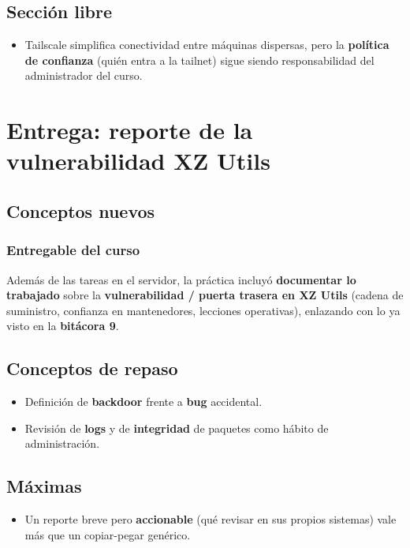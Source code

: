 \documentclass[11pt, letterpaper]{article}
\begin{document}
\subsection{Sección libre}
\label{sec:orgf17d0d6}

\begin{itemize}
\item Tailscale simplifica conectividad entre máquinas dispersas, pero la \textbf{política de confianza} (quién entra a la tailnet) sigue siendo responsabilidad del administrador del curso.
\end{itemize}
\section{Entrega: reporte de la vulnerabilidad XZ Utils}
\label{sec:orgd9d4189}

\subsection{Conceptos nuevos}
\label{sec:orgd1640f5}

\subsubsection{Entregable del curso}
\label{sec:orgc9331b4}
Además de las tareas en el servidor, la práctica incluyó \textbf{documentar lo trabajado} sobre la \textbf{vulnerabilidad / puerta trasera en XZ Utils} (cadena de suministro, confianza en mantenedores, lecciones operativas), enlazando con lo ya visto en la \textbf{bitácora 9}.
\subsection{Conceptos de repaso}
\label{sec:org98b35d5}

\begin{itemize}
\item Definición de \textbf{backdoor} frente a \textbf{bug} accidental.
\item Revisión de \textbf{logs} y de \textbf{integridad} de paquetes como hábito de administración.
\end{itemize}
\subsection{Máximas}
\label{sec:org9e3bbfa}

\begin{itemize}
\item Un reporte breve pero \textbf{accionable} (qué revisar en sus propios sistemas) vale más que un copiar-pegar genérico.
\end{itemize}
\end{document}
